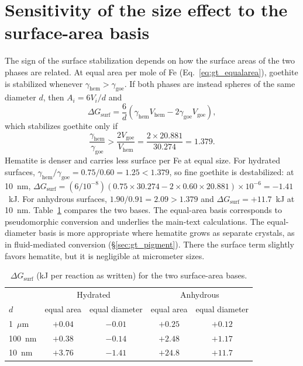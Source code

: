 \section{Sensitivity of the size effect to the surface-area basis}
\label{sec:gt_supp_basis}

The sign of the surface stabilization depends on how the surface areas of the two phases are
related. At equal area per mole of Fe (Eq.~\eqref{eq:gt_equalarea}), goethite is stabilized
whenever $\gamma_{\mathrm{hem}}>\gamma_{\mathrm{goe}}$. If both phases are instead spheres of the
same diameter $d$, then $A_i = 6V_i/d$ and
\begin{equation}
  \Delta G_{\mathrm{surf}} = \frac{6}{d}\left(\gamma_{\mathrm{hem}}V_{\mathrm{hem}} - 2\gamma_{\mathrm{goe}}V_{\mathrm{goe}}\right),
\end{equation}
which stabilizes goethite only if
\begin{equation}
  \frac{\gamma_{\mathrm{hem}}}{\gamma_{\mathrm{goe}}} > \frac{2V_{\mathrm{goe}}}{V_{\mathrm{hem}}} = \frac{2\times20.881}{30.274} = 1.379 .
\end{equation}
Hematite is denser and carries less surface per Fe at equal size. For hydrated surfaces,
$\gamma_{\mathrm{hem}}/\gamma_{\mathrm{goe}} = 0.75/0.60 = 1.25 < 1.379$, so fine goethite is
destabilized: at 10~nm,
$\Delta G_{\mathrm{surf}} = (6/10^{-8})(0.75\times30.274 - 2\times0.60\times20.881)\times10^{-6} = -1.41$~kJ.
For anhydrous surfaces, $1.90/0.91 = 2.09 > 1.379$ and $\Delta G_{\mathrm{surf}} = +11.7$~kJ at
10~nm. Table~\ref{tab:gt_basis} compares the two bases. The equal-area basis corresponds to
pseudomorphic conversion and underlies the main-text calculations. The equal-diameter basis is
more appropriate where hematite grows as separate crystals, as in fluid-mediated conversion
(\S\ref{sec:gt_pigment}). There the surface term slightly favors hematite, but it is
negligible at micrometer sizes.

\begin{table}[htbp]
  \centering
  \caption{$\Delta G_{\mathrm{surf}}$ (kJ per reaction as written) for the two surface-area bases.}
  \label{tab:gt_basis}
  \begin{tabular}{lcccc}
    \hline
    & \multicolumn{2}{c}{Hydrated} & \multicolumn{2}{c}{Anhydrous} \\
    $d$ & equal area & equal diameter & equal area & equal diameter \\
    \hline
    1~$\mu$m & $+0.04$ & $-0.01$ & $+0.25$ & $+0.12$ \\
    100~nm & $+0.38$ & $-0.14$ & $+2.48$ & $+1.17$ \\
    10~nm & $+3.76$ & $-1.41$ & $+24.8$ & $+11.7$ \\
    \hline
  \end{tabular}
\end{table}

